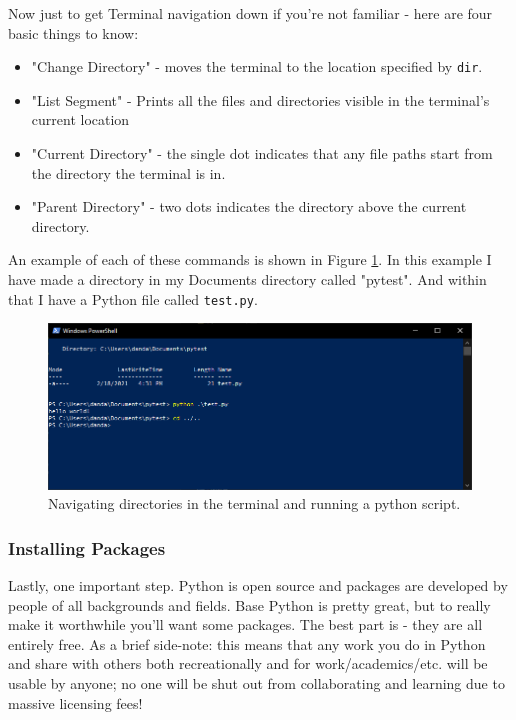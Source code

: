 \documentclass[oneside]{book}
\begin{document}
Now just to get Terminal navigation down if you're not familiar - here are four basic things to know:

\begin{itemize}
	\item{ "Change Directory" - moves the terminal to the location specified by \texttt{dir}.}
	\item{ "List Segment" - Prints all the files and directories visible in the terminal's current location}
	\item{ "Current Directory" - the single dot indicates that any file paths start from the directory the terminal is in.}
	\item{ "Parent Directory" - two dots indicates the directory above the current directory.}
\end{itemize}

An example of each of these commands is shown in Figure \ref{fig:pytest}. In this example I have made a directory in my Documents directory called "pytest". And within that I have a Python file called \texttt{test.py}. 

\begin{figure}[H]
\centering
\includegraphics[width=0.7\linewidth]{./img/pytest.PNG}
\caption{Navigating directories in the terminal and running a python script.}
\label{fig:pytest}
\end{figure}

\subsubsection{Installing Packages}

Lastly, one important step. Python is open source and packages are developed by people of all backgrounds and fields. Base Python is pretty great, but to really make it worthwhile you'll want some packages. The best part is - they are all entirely free. As a brief side-note: this means that any work you do in Python and share with others both recreationally and for work/academics/etc. will be usable by anyone; no one will be shut out from collaborating and learning due to massive licensing fees!
\end{document}
